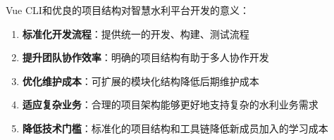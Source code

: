 Vue CLI和优良的项目结构对智慧水利平台开发的意义：

\begin{enumerate}
\def\labelenumi{\arabic{enumi}.}
\tightlist
\item
  \textbf{标准化开发流程}：提供统一的开发、构建、测试流程
\item
  \textbf{提升团队协作效率}：明确的项目结构有助于多人协作开发
\item
  \textbf{优化维护成本}：可扩展的模块化结构降低后期维护成本
\item
  \textbf{适应复杂业务}：合理的项目架构能够更好地支持复杂的水利业务需求
\item
  \textbf{降低技术门槛}：标准化的项目结构和工具链降低新成员加入的学习成本
\end{enumerate}
